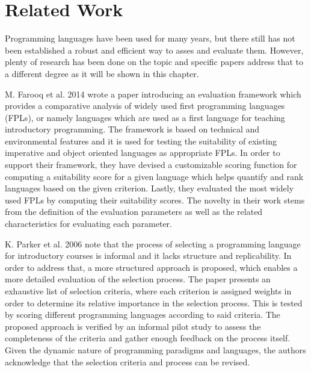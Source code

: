 \chapter{Related Work}
\label{chap:related_work}

Programming languages have been used for many years, but there still has not been established a robust and efficient way to asses and evaluate them. However, plenty of research has been done on the topic and specific papers address that to a different degree as it will be shown in this chapter. 

M. Farooq et al. 2014 \cite{FPLEvalFramework} wrote a paper introducing an evaluation framework which provides a comparative analysis of widely used first programming languages (FPLs), or namely languages which are used as a first language for teaching introductory programming. The framework is based on technical and environmental features and it is used for testing the suitability of existing imperative and object oriented languages as appropriate FPLs. In order to support their framework, they have devised a customizable scoring function for computing a  suitability score for a given language which helps quantify and rank languages based on the given criterion. Lastly, they evaluated the most widely used FPLs by computing their suitability scores. The novelty in their work stems from the definition of the evaluation parameters as well as the related characteristics for evaluating each parameter.

K. Parker et al. 2006 \cite{LangSelectionProcess} note that the process of selecting a programming language for introductory courses is informal and it lacks structure and replicability. In order to address that, a more structured approach is proposed, which enables a more detailed evaluation of the selection process. The paper presents an exhaustive list of selection criteria, where each criterion is assigned weights in order to determine its relative importance in the selection process. This is tested by scoring different programming languages according to said criteria. The proposed approach is verified by an informal pilot study to assess the completeness of the criteria and gather enough feedback on the process itself. Given the dynamic nature of programming paradigms and languages, the authors acknowledge that the selection criteria and process can be revised.

